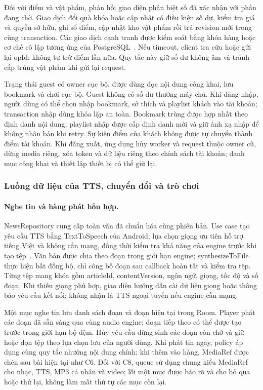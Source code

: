 Đối với điểm và vật phẩm, phản hồi giao diện phân biệt số đã xác nhận với phần đang chờ. Giao dịch đổi quà khóa hoặc cập nhật có điều kiện số dư, kiểm tra giá và quyền sở hữu, ghi sổ điểm, cập nhật kho vật phẩm rồi trả revision mới trong cùng transaction. Các giao dịch cạnh tranh được kiểm soát bằng khóa hàng hoặc cơ chế cô lập tương ứng của PostgreSQL~\cite{postgres-transactions}. Nếu timeout, client tra cứu hoặc gửi lại opId; không tự trừ điểm lần nữa. Quy tắc này giữ số dư không âm và tránh cấp trùng vật phẩm khi gửi lại request.

Trạng thái guest có owner cục bộ, được dùng đọc nội dung công khai, lưu bookmark và chơi cục bộ. Guest không có số dư thưởng máy chủ. Khi đăng nhập, người dùng có thể chọn nhập bookmark, sở thích và playlist khách vào tài khoản; transaction nhập dùng khóa lặp an toàn. Bookmark trùng được hợp nhất theo định danh nội dung, playlist nhập được cấp định danh mới và giữ ánh xạ nhập để không nhân bản khi retry. Sự kiện điểm của khách không được tự chuyển thành điểm tài khoản. Khi đăng xuất, ứng dụng hủy worker và request thuộc owner cũ, dừng media riêng, xóa token và dữ liệu riêng theo chính sách tài khoản; danh mục công khai và thiết lập thiết bị có thể giữ lại.

\subsubsection{Luồng dữ liệu của TTS, chuyển đổi và trò chơi}
\label{sec:data-pipelines}

\paragraph{Nghe tin và hàng phát hỗn hợp.}
NewsRepository cung cấp toàn văn đã chuẩn hóa cùng phiên bản. Use case tạo yêu cầu TTS bằng TextToSpeech của Android; lựa chọn giọng ưu tiên hỗ trợ tiếng Việt và không cần mạng, đồng thời kiểm tra khả năng của engine trước khi tạo tệp~\cite{android-tts}. Văn bản được chia theo đoạn trong giới hạn engine; synthesizeToFile thực hiện bất đồng bộ, chỉ công bố đoạn sau callback hoàn tất và kiểm tra tệp. Từng tệp mang khóa gồm articleId, contentVersion, ngôn ngữ, giọng, tốc độ và số đoạn. Khi thiếu giọng phù hợp, giao diện hướng dẫn cài dữ liệu giọng hoặc thông báo yêu cầu kết nối; không nhận là TTS ngoại tuyến nếu engine cần mạng.

Một mục nghe tin lưu danh sách đoạn và đoạn hiện tại trong Room. Player phát các đoạn đã sẵn sàng qua cùng audio engine; đoạn tiếp theo có thể được tạo trước trong giới hạn bộ đệm. Hủy yêu cầu dừng sinh các đoạn còn chờ và giữ hoặc dọn tệp theo lựa chọn lưu của người dùng. Khi phát tin ngay, policy áp dụng cùng quy tắc nhường nội dung chính; khi thêm vào hàng, MediaRef được chèn sau bài hiện tại như C6. Đối với C8, queue sử dụng chung kiểu MediaRef cho nhạc, TTS, MP3 cá nhân và video; lỗi một mục được báo rõ và cho bỏ qua hoặc thử lại, không làm mất thứ tự các mục còn lại.

